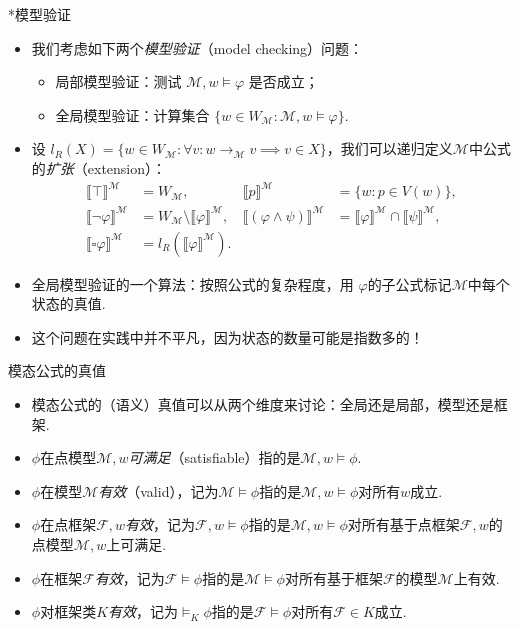     
    {*模型验证}
    \begin{itemize}
        \item 我们考虑如下两个\emph{模型验证}（model checking）问题：
        \begin{itemize}
        \item 局部模型验证：测试 $\mathcal M,w \vDash \varphi$ 是否成立；
        \item 全局模型验证：计算集合 $\{w \in W_{\mathcal M} : \mathcal M,w \vDash \varphi\}$.
        \end{itemize}
        \item 设 $l_R(X) = \{w \in W_{\mathcal M} : \forall v : w \to_{\mathcal M} v \implies v \in X\}$，我们可以递归定义$\mathcal M$中公式的\emph{扩张}（extension）：
    \[\begin{array}{rlrl}\llbracket \top \rrbracket^{\mathcal{M}} & =W_{\mathcal{M}}, & \llbracket p \rrbracket^{\mathcal{M}} & =\{w : p \in V(w)\}, \\ 
    \llbracket \neg \varphi \rrbracket^{\mathcal{M}} & =W_{\mathcal M}\setminus \llbracket \varphi \rrbracket^{\mathcal{M}}, & \llbracket(\varphi \wedge \psi) \rrbracket^{\mathcal{M}} & =\llbracket \varphi \rrbracket^{\mathcal{M}} \cap \llbracket \psi \rrbracket^{\mathcal{M}}, \\
    \llbracket \square \varphi \rrbracket^{\mathcal{M}} & =l_R\left(\llbracket \varphi \rrbracket^{\mathcal{M}}\right).\end{array}\]
        \item 全局模型验证的一个算法：按照公式的复杂程度，用 $\varphi$的子公式标记$\mathcal M$中每个状态的真值.
        \item 这个问题在实践中并不平凡，因为状态的数量可能是指数多的！
    \end{itemize}
    
    
    {模态公式的真值} %
    \begin{itemize}
        \item 模态公式的（语义）真值可以从两个维度来讨论：全局还是局部，模型还是框架.
        \item $\phi$在点模型$\mathcal M,w$\emph{可满足}（satisfiable）指的是$\mathcal M,w\vDash \phi$.
        \item $\phi$在模型$\mathcal M$\emph{有效}（valid），记为$\mathcal M\vDash \phi$指的是$\mathcal M,w\vDash\phi$对所有$w$成立.
        \item $\phi$在点框架$\mathcal F,w$\emph{有效}，记为$\mathcal F,w\vDash \phi$指的是$\mathcal M,w\vDash\phi$对所有基于点框架$\mathcal F,w$的点模型$\mathcal M, w$上可满足.
        \item $\phi$在框架$\mathcal F$\emph{有效}，记为$\mathcal F\vDash \phi$指的是$\mathcal M\vDash\phi$对所有基于框架$\mathcal F$的模型$\mathcal M$上有效.
        \item $\phi$对框架类$K$\emph{有效}，记为$\vDash_K\phi$指的是$\mathcal F\vDash\phi$对所有$\mathcal F\in K$成立.
    \end{itemize}
    
